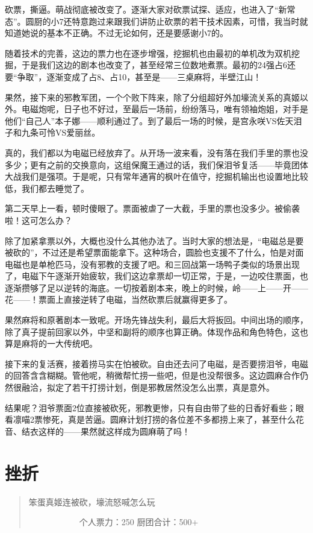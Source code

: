 砍票，撕逼。萌战彻底被改变了。逐渐大家对砍票试探、适应，也进入了“新常态”。圆厨的小7还特意跑过来跟我们讲防止砍票的若干技术因素，可惜，我当时就知道她说的基本不正确。不过无论如何，还是要感谢小7的。

随着技术的完善，这边的票力也在逐步增强，挖掘机也由最初的单机改为双机挖掘，于是我们这边的剧本也改变了，甚至经常三位数地煮票。最初的24强占6还要“争取”，逐渐变成了占8、占10，甚至是——三桌麻将，半壁江山！

果然，接下来的邪教军团，一个个败下阵来，除了分组超好外加壕流关系的真姬以外。电磁炮呢，日子也不好过，至最后一场前，纷纷落马，唯有领袖炮姐，对手是他们“自己人”本子娜——顺利通过了。到了最后一场的时候，是宫永咲VS佐天泪子和九条可怜VS爱丽丝。

真的，我们都以为电磁已经放弃了。从开场一波来看，没有落在我们手里的票也没多少；更有之前的交换意向，这组保魔王通过的话，我们保泪爷复活——毕竟团体大战我们是强项。于是呢，只有常年通宵的枫叶在值守，挖掘机输出也设置地比较低，我们都去睡觉了。

第二天早上一看，顿时傻眼了。票面被虐了一大截，手里的票也没多少。被偷袭啦！这可怎么办？

除了加紧拿票以外，大概也没什么其他办法了。当时大家的想法是，“电磁总是要被砍的”，不过还是希望票面能拿下。这种场合，圆脸也支援不了什么，怕是对面电磁也是单枪匹马，没有邪教的支援了吧。和三回战第一场鸭子类似的场景出现了，电磁下午逐渐开始疲软，我们这边拿票却一切正常，于是，一边咬住票面，也逐渐攒够了足以逆转的海底。一切按着剧本来，晚上的时候，岭——上——开——花——！票面上直接逆转了电磁，当然砍票后就赢得更多了。

果然麻将和原著剧本一致呢。开场先锋战失利，最后大将扳回。中间出场的顺序，除了真子提前回家以外，中坚和副将的顺序也算正确。体现作品和角色特色，这也算是麻将的一大传统吧。

接下来的复活赛，接着捞马实在怕被砍。自由还去问了电磁，是否要捞泪爷，电磁的回答含含糊糊。管他呢，稍微帮忙捞一些吧，但是也没帮很多。这边圆麻合作仍然很融洽，拟定了若干打捞计划，倒是邪教居然没怎么出票，真是意外。

结果呢？泪爷票面2位直接被砍死，邪教更惨，只有自由带了些的日香好看些；眼看凛喵2票惨死，真是苦逼。圆麻计划打捞的各位差不多都捞上来了，甚至什么花音、结衣这样的——果然就这样成为圆麻萌了吗！


\chapter{挫折}
\begin{quote}
笨蛋真姬连被砍，壕流怒喊怎么玩

　　　　　　个人票力：250 厨团合计：500+
\end{quote}

